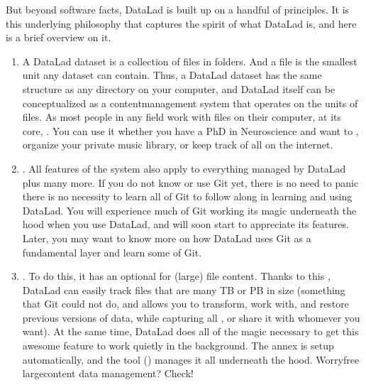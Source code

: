 \sphinxAtStartPar
But beyond software facts, DataLad is built up on a handful of principles. It is this underlying philosophy
that captures the spirit of what DataLad is, and here is a brief overview on it.
\begin{enumerate}
%
\item {} 
\sphinxAtStartPar
{}
A DataLad dataset is a collection of files in folders.
And a file is the smallest unit any dataset can contain. Thus, a DataLad
dataset has the same structure as any directory on your computer, and
DataLad itself can be conceptualized as a content\sphinxhyphen{}management system that operates
on the units of files. As most people
in any field work with files on their computer, at its core,
.
You can use it whether you have a PhD in Neuroscience and want to
,
organize your private music library, or keep track of all
on the internet.

\item {} 
\sphinxAtStartPar
{}.
All features of the {\hyperref[\detokenize{glossary:term-version-control}]{}} system {\hyperref[\detokenize{glossary:term-Git}]{}}
also apply to everything managed by DataLad \textendash{} plus many more.
If you do not know or use Git yet, there is no need to panic \textendash{} there is no necessity to
learn all of Git to follow along in learning and using DataLad. You will
experience much of Git working its magic underneath the hood when you use DataLad,
and will soon start to appreciate its features. Later, you may want to know more
on how DataLad uses Git as a fundamental layer and learn some of Git.

\item {} 
\sphinxAtStartPar
{}.
To do this, it has an optional  for (large) file content.
Thanks to this {\hyperref[\detokenize{glossary:term-annex}]{}}, DataLad can easily track files that are many TB or PB in size
(something that Git could not do, and allows you to transform, work with, and restore previous
versions of data, while capturing all {\hyperref[\detokenize{glossary:term-provenance}]{}},
or share it with whomever you want). At the same time, DataLad does all of the magic
necessary to get this awesome feature to work quietly in the background.
The annex is set\sphinxhyphen{}up automatically, and the tool {\hyperref[\detokenize{glossary:term-git-annex}]{}}
() manages it all underneath the hood. Worry\sphinxhyphen{}free
large\sphinxhyphen{}content data management? Check!


\end{enumerate}
